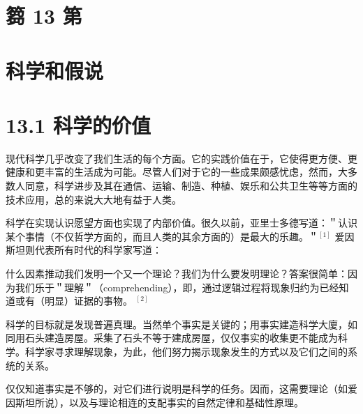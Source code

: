\section*{篘 13 第}
\section*{科学和假说}

\section*{13.1 科学的价值}
现代科学几乎改变了我们生活的每个方面。它的实践价值在于，它使得更方便、更健康和更丰富的生活成为可能。尽管人们对于它的一些成果颇感忧虑，然而，大多数人同意，科学进步及其在通信、运输、制造、种植、娱乐和公共卫生等等方面的技术应用，总的来说大大地有益于人类。

科学在实现认识愿望方面也实现了内部价值。很久以前，亚里士多德写道：＂认识某个事情（不仅哲学方面的，而且人类的其余方面的）是最大的乐趣。＂${ }^{[1]}$ 爱因斯坦则代表所有时代的科学家写道：

\begin{displayquote}
什么因素推动我们发明一个又一个理论？我们为什么要发明理论？答案很简单：因为我们乐于＂理解＂（comprehending），即，通过逻辑过程将现象归约为已经知道或有（明显）证据的事物。 ${ }^{[2]}$
\end{displayquote}

科学的目标就是发现普遍真理。当然单个事实是关键的；用事实建造科学大廈，如同用石头建造房屋。采集了石头不等于建成房屋，仅仅事实的收集更不能成为科学。科学家寻求理解现象，为此，他们努力揭示现象发生的方式以及它们之间的系统的关系。

仅仅知道事实是不够的，对它们进行说明是科学的任务。因而，这需要理论（如爱因斯坦所说），以及与理论相连的支配事实的自然定律和基础性原理。 